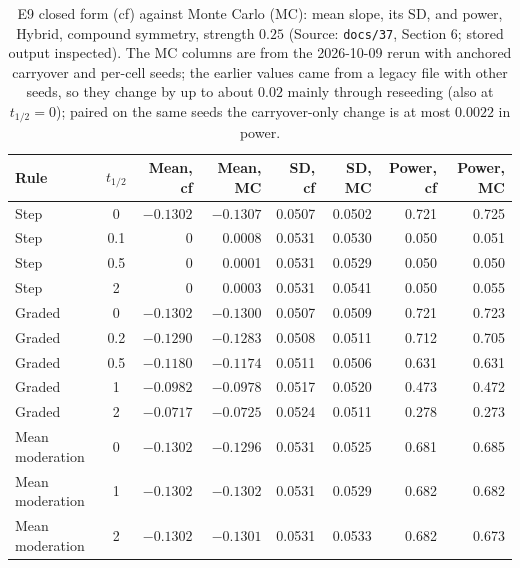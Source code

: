 \documentclass[11pt]{article}
\newcommand{\code}[1]{\texttt{#1}}
\begin{document}
\begin{table}[h]
\centering\small
\caption{E9 closed form (cf) against Monte Carlo (MC): mean slope, its
SD, and power, Hybrid, compound symmetry, strength $0.25$ (Source:
\code{docs/37}, Section 6; stored output inspected). The MC columns
are from the 2026-10-09 rerun with anchored carryover and per-cell
seeds; the earlier values came from a legacy file with other seeds, so
they change by up to about $0.02$ mainly through reseeding (also at
$t_{1/2} = 0$); paired on the same seeds the carryover-only change is
at most $0.0022$ in power.}
\label{tab:inve-mc-hybrid}
\begin{tabular}{@{}lcrrrrrr@{}}
\toprule
Rule & $t_{1/2}$ & Mean, cf & Mean, MC & SD, cf & SD, MC & Power, cf & Power, MC \\
\midrule
Step & 0   & $-0.1302$ & $-0.1307$ & 0.0507 & 0.0502 & 0.721 & 0.725 \\
Step & 0.1 & 0 & 0.0008 & 0.0531 & 0.0530 & 0.050 & 0.051 \\
Step & 0.5 & 0 & 0.0001 & 0.0531 & 0.0529 & 0.050 & 0.050 \\
Step & 2   & 0 & 0.0003 & 0.0531 & 0.0541 & 0.050 & 0.055 \\
Graded & 0   & $-0.1302$ & $-0.1300$ & 0.0507 & 0.0509 & 0.721 & 0.723 \\
Graded & 0.2 & $-0.1290$ & $-0.1283$ & 0.0508 & 0.0511 & 0.712 & 0.705 \\
Graded & 0.5 & $-0.1180$ & $-0.1174$ & 0.0511 & 0.0506 & 0.631 & 0.631 \\
Graded & 1   & $-0.0982$ & $-0.0978$ & 0.0517 & 0.0520 & 0.473 & 0.472 \\
Graded & 2   & $-0.0717$ & $-0.0725$ & 0.0524 & 0.0511 & 0.278 & 0.273 \\
Mean moderation & 0 & $-0.1302$ & $-0.1296$ & 0.0531 & 0.0525 & 0.681 & 0.685 \\
Mean moderation & 1 & $-0.1302$ & $-0.1302$ & 0.0531 & 0.0529 & 0.682 & 0.682 \\
Mean moderation & 2 & $-0.1302$ & $-0.1301$ & 0.0531 & 0.0533 & 0.682 & 0.673 \\
\bottomrule
\end{tabular}
\end{table}
\end{document}

